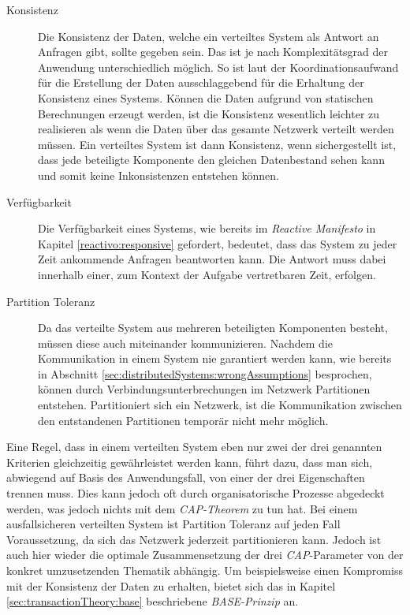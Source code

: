 \begin{description}
\item[Konsistenz]
Die Konsistenz der Daten, welche ein verteiltes System als Antwort an Anfragen gibt, sollte gegeben sein. Das ist je nach Komplexitätsgrad der Anwendung unterschiedlich möglich. So ist laut \cite{gilbertPerspectiveCAPTheorem2012} der Koordinationsaufwand für die Erstellung der Daten ausschlaggebend für die Erhaltung der Konsistenz eines Systems. Können die Daten aufgrund von statischen Berechnungen erzeugt werden, ist die Konsistenz wesentlich leichter zu realisieren als wenn die Daten über das gesamte Netzwerk verteilt werden müssen. Ein verteiltes System ist dann Konsistenz, wenn sichergestellt ist, dass jede beteiligte Komponente den gleichen Datenbestand sehen kann und somit keine Inkonsistenzen entstehen können.   
% 
% 
% 

\item[Verfügbarkeit]
Die Verfügbarkeit eines Systems, wie bereits im {\textit{Reactive Manifesto}} in Kapitel \ref{reactivo:responsive} gefordert, bedeutet, dass das System zu jeder Zeit ankommende Anfragen beantworten kann. Die Antwort muss dabei innerhalb einer, zum Kontext der Aufgabe vertretbaren Zeit, erfolgen.

\item[Partition Toleranz]
Da das verteilte System aus mehreren beteiligten Komponenten besteht, müssen diese auch miteinander kommunizieren. Nachdem die Kommunikation in einem System nie garantiert werden kann, wie bereits in Abschnitt \ref{sec:distributedSystems:wrongAssumptions} besprochen, können durch Verbindungsunterbrechungen im Netzwerk Partitionen entstehen. Partitioniert sich ein Netzwerk, ist die Kommunikation zwischen den entstandenen Partitionen temporär nicht mehr möglich.
\end{description}
Eine Regel, dass in einem verteilten System eben nur zwei der drei genannten Kriterien gleichzeitig gewährleistet werden kann, führt dazu, dass man sich, abwiegend auf Basis des Anwendungsfall, von einer der drei Eigenschaften trennen muss. Dies kann jedoch oft durch organisatorische Prozesse abgedeckt werden, was jedoch nichts mit dem \textit{CAP-Theorem} zu tun hat. Bei einem ausfallsicheren verteilten System ist Partition Toleranz auf jeden Fall Voraussetzung, da sich das Netzwerk jederzeit partitionieren kann. Jedoch ist auch hier wieder die optimale Zusammensetzung der drei \textit{CAP}-Parameter von der konkret umzusetzenden Thematik abhängig. Um beispielsweise einen Kompromiss mit der Konsistenz der Daten zu erhalten, bietet sich das in Kapitel \ref{sec:transactionTheory:base} beschriebene \textit{BASE-Prinzip} an.
% 
% 
% 
